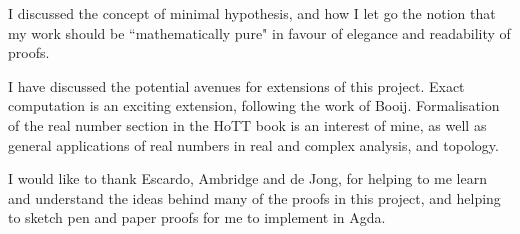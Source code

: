 \documentclass[ProjectReport]{subfiles}
\begin{document}
I discussed the concept of minimal hypothesis, and how I let go the notion that my work should be ``mathematically pure" in favour of elegance and readability of proofs.

I have discussed the potential avenues for extensions of this project. Exact computation is an exciting extension, following the work of Booij. Formalisation of the real number section in the HoTT book is an interest of mine, as well as general applications of real numbers in real and complex analysis, and topology.

I would like to thank Escardo, Ambridge and de Jong, for helping to me learn and understand the ideas behind many of the proofs in this project, and helping to sketch pen and paper proofs for me to implement in Agda.
\end{document}
